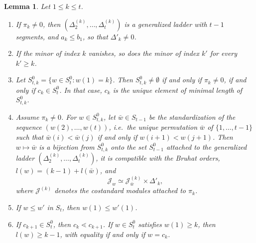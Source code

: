 \documentclass[a4paper,12pt,leqno]{amsart}
\newcommand{\caJ}{\mathcal{J}}
\theoremstyle{plain}
\newtheorem{lemma}[thm]{Lemma}
\theoremstyle{definition}
\theoremstyle{definition}
\begin{document}
\begin{lemma}\label{lem:minors} Let $1\leq k\leq t$.
\begin{enumerate}
\item[(i)] If $\pi_k\neq 0$, then $(\Delta^{(k)}_2,\ldots,\Delta^{(k)}_t)$ is a generalized ladder
with $t-1$ segments, and $a_k\leq b_1$, so that $\Delta'_k\neq 0$.
\item[(ii)] If the minor of index $k$ vanishes, so does the minor of index $k'$ for every $k'\geq k$.
\item[(iii)] Let $S_{t,k}^0=\{w\in S_t^0 : w(1)=k\}$. Then $S_{t,k}^0\neq\emptyset$ if and only if
$\pi_k\neq 0$, if and only if $c_k\in S_t^0$. In that case, $c_k$ is the unique element of minimal
length of $S_{t,k}^0$.
\item[(iv)] Assume $\pi_k\neq 0$. For $w\in S_{t,k}^0$, let $\bar w\in S_{t-1}$ be the
standardization of the sequence $(w(2),\allowbreak\ldots,\allowbreak w(t))$, i.e.\ the unique permutation $\bar w$ of
$\{1,\ldots,t-1\}$ such that $\bar w(i)<\bar w(j)$ if and only if $w(i+1)<w(j+1)$.
Then $w\mapsto\bar w$ is a bijection from $S_{t,k}^0$ onto the set $S^0_{t-1}$ attached to the
generalized ladder
$(\Delta^{(k)}_2,\ldots,\Delta^{(k)}_t)$, it is compatible with the Bruhat orders, $l(w)=(k-1)+l(\bar w)$, and
\[\caJ_w\simeq \caJ^{(k)}_{\bar w}\times\Delta'_k,\]
where $\caJ^{(k)}$ denotes the costandard modules attached to $\pi_k$.
\item[(v)] If $w\leq w'$ in $S_t$, then $w(1)\leq w'(1)$.
\item[(vi)] If $c_{k+1}\in S_t^0$, then $c_k\lessdot c_{k+1}$. If $w\in S_t^0$ satisfies $w(1)\geq
k$, then $l(w)\geq k-1$, with equality if and only if $w=c_k$.
\end{enumerate}
\end{lemma}
\end{document}
